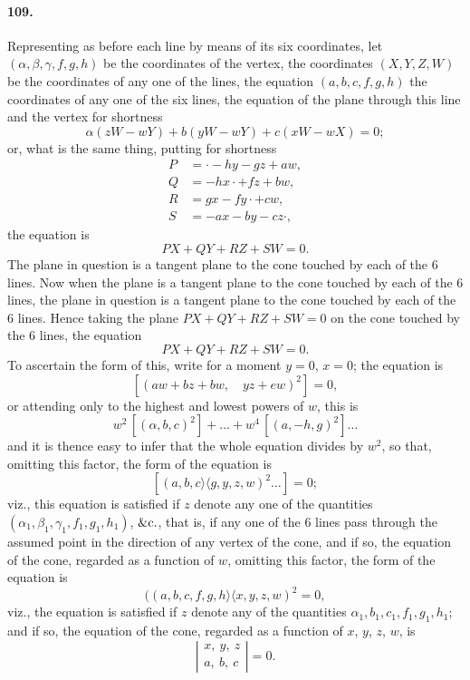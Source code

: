 \documentclass[11pt,a4paper]{article}
\providecommand{\quant}{\mathrel{\rangle\!\langle}}
\begin{document}
\paragraph{109.}
Representing as before each line by means of its six coordinates, let
$(\alpha, \beta, \gamma, f, g, h)$ be the coordinates of the vertex, the coordinates
$(X, Y, Z, W)$ be the coordinates of any one of the lines, the equation
$(a, b, c, f, g, h)$ the coordinates of any one of the six lines, the equation of the
plane through this line and the vertex for shortness
\[
\alpha(z W - w Y) + b(y W - w Y) + c(x W - w X) = 0;
\]
or, what is the same thing, putting for shortness
\begin{align*}
P &= \cdot - hy - gz + aw,\\
Q &= -hx \cdot + fz + bw,\\
R &= gx - fy \cdot + cw,\\
S &= -ax - by - cz \cdot ,
\end{align*}
the equation is
\[
PX + QY + RZ + SW = 0.
\]
The plane in question is a tangent plane to the cone touched by each of the $6$ lines.
Now when the plane is a tangent plane to the cone touched by each of the $6$ lines,
the plane in question is a tangent plane to the cone touched by each of the $6$ lines.
Hence taking the plane $PX + QY + RZ + SW = 0$ on the cone touched by the $6$ lines,
the equation
\[
PX + QY + RZ + SW = 0.
\]
To ascertain the form of this, write for a moment $y = 0$, $x = 0$; the equation is
\[
[(aw + bz + bw,\quad yz + ew)^2] = 0,
\]
or attending only to the highest and lowest powers of $w$, this is
\[
w^2\,[(\alpha, b, c)^2] + \ldots + w^4\,[(a, -h, g)^2] \ldots
\]
and it is thence easy to infer that the whole equation divides by $w^2$, so that, omitting
this factor, the form of the equation is
\[
[(a, b, c \quant g, y, z, w)^2 \ldots ] = 0;
\]
viz., this equation is satisfied if $z$ denote any one of the quantities
$(\alpha_1, \beta_1, \gamma_1, f_1, g_1, h_1)$, $\&{\rm c}.$, that is, if any one of
the $6$ lines pass through the assumed point in the direction of any vertex of the
cone, and if so, the equation of the cone, regarded as a function of $w$, omitting
this factor, the form of the equation is
\[
((a, b, c, f, g, h \quant x, y, z, w)^2 = 0,
\]
viz., the equation is satisfied if $z$ denote any of the quantities
$\alpha_1, b_1, c_1, f_1, g_1, h_1$; and if so, the equation of the cone, regarded
as a function of $x$, $y$, $z$, $w$, is
\[
\left|\begin{array}{c}
x,\ y,\ z\\ a,\ b,\ c
\end{array}\right| = 0.
\]
\end{document}
